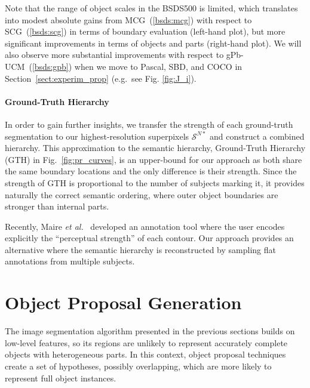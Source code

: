 \documentclass[10pt,journal,cspaper,compsoc]{IEEEtran}
\newcommand*{\etal}{\textit{et al.}\ }
\begin{document}
Note that the range of object scales in the BSDS500 is limited, which translates into modest absolute gains
from MCG~(\ref{bsds:mcg}) with respect to SCG~(\ref{bsds:scg}) in terms of boundary evaluation (left-hand plot),
but more significant improvements in terms of objects and parts (right-hand plot). 
We will also observe more substantial improvements with respect to gPb-UCM~(\ref{bsds:gpb}) when we move to Pascal, SBD, and COCO in Section~\ref{sect:experim_prop} (e.g.\ see Fig. \ref{fig:J_i}).

\paragraph*{\textbf{Ground-Truth Hierarchy}}
In order to gain further insights, %
we transfer the strength of each ground-truth segmentation to our highest-resolution superpixels $\mathcal{S}^{N*}$ and construct a combined hierarchy.
This approximation to the semantic hierarchy, Ground-Truth Hierarchy (GTH) in Fig.~\ref{fig:pr_curves}, is an upper-bound for our approach as both share the same boundary locations and the only difference is their strength. 
Since the strength of GTH is proportional to the number of subjects marking it, it provides naturally the correct semantic ordering, where outer object boundaries are stronger than internal parts. 

Recently, Maire \etal \cite{Maire-etal:BMVC13} developed an annotation tool where the user encodes explicitly the ``perceptual strength'' of each contour. 
Our approach provides an alternative where the semantic hierarchy is reconstructed by sampling flat annotations from multiple subjects.

\section{Object Proposal Generation}
\label{sec:obj_prop}
The image segmentation algorithm presented in the previous sections builds on low-level features,
so its regions are unlikely to represent accurately complete objects with heterogeneous parts.
In this context, object proposal techniques create a set of hypotheses, possibly overlapping,
which are more likely to represent full object instances.
\end{document}
